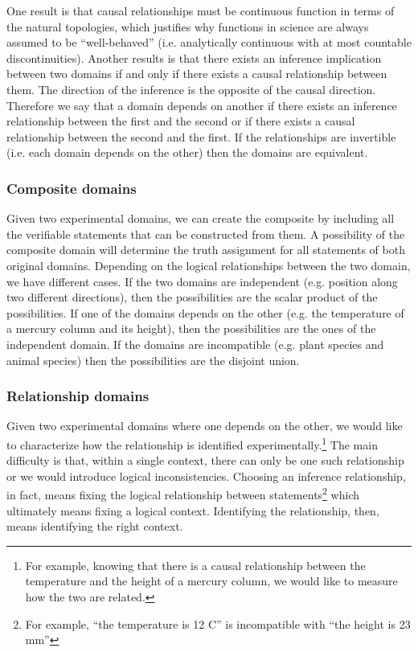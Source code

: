 \documentclass[twocolumn]{article}
\begin{document}
One result is that causal relationships must be continuous function in terms of the natural topologies, which justifies why functions in science are always assumed to be ``well-behaved'' (i.e. analytically continuous with at most countable discontinuities). Another results is that there exists an inference implication between two domains if and only if there exists a causal relationship between them. The direction of the inference is the opposite of the causal direction. Therefore we say that a domain depends on another if there exists an inference relationship between the first and the second or if there exists a causal relationship between the second and the first. If the relationships are invertible (i.e. each domain depends on the other) then the domains are equivalent.

\subsubsection{Composite domains}

Given two experimental domains, we can create the composite by including all the verifiable statements that can be constructed from them. A possibility of the composite domain will determine the truth assignment for all statements of both original domains. Depending on the logical relationships between the two domain, we have different cases. If the two domains are independent (e.g. position along two different directions), then the possibilities are the scalar product of the possibilities. If one of the domains depends on the other (e.g. the temperature of a mercury column and its height), then the possibilities are the ones of the independent domain. If the domains are incompatible (e.g. plant species and animal species) then the possibilities are the disjoint union.


\subsubsection{Relationship domains}

Given two experimental domains where one depends on the other, we would like to characterize how the relationship is identified experimentally.\footnote{For example, knowing that there is a causal relationship between the temperature and the height of a mercury column, we would like to measure how the two are related.} The main difficulty is that, within a single context, there can only be one such relationship or we would introduce logical inconsistencies. Choosing an inference relationship, in fact, means fixing the logical relationship between statements\footnote{For example, ``the temperature is 12 C'' is incompatible with ``the height is 23 mm''} which ultimately means fixing a logical context. Identifying the relationship, then, means identifying the right context.
\end{document}
